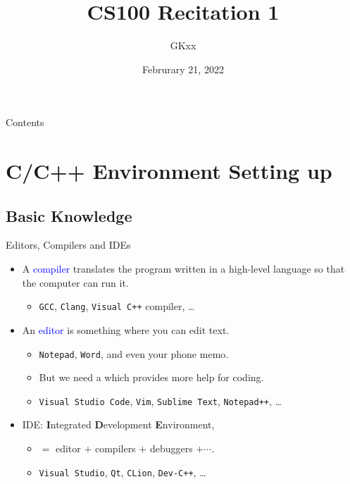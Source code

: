 \documentclass{beamer}
\title{CS100 Recitation 1}
\author{GKxx}
\date{Februrary 21, 2022}
\newcommand{\blue}[1]{\textcolor{blue}{#1}}
\begin{document}
\begin{frame}
    \maketitle
\end{frame}

\begin{frame}{Contents}
    \tableofcontents
\end{frame}

\section{C/C++ Environment Setting up}

\subsection{Basic Knowledge}

\begin{frame}{Editors, Compilers and IDEs}
    \begin{itemize}
        \item A \blue{compiler} translates the program written in a high-level language so that the computer can run it.
        \begin{itemize}
            \item \texttt{GCC}, \texttt{Clang}, \texttt{Visual C++} compiler, \dots
        \end{itemize}
        \pause
        \item An \blue{editor} is something where you can edit text.
        \begin{itemize}
            \item \texttt{Notepad}, \texttt{Word}, and even your phone memo.
            \pause
            \item But we need a  which provides more help for coding.
            \item \texttt{Visual Studio Code}, \texttt{Vim}, \texttt{Sublime Text}, \texttt{Notepad++}, \dots
        \end{itemize}
        \pause
        \item IDE: \textbf{I}ntegrated \textbf{D}evelopment \textbf{E}nvironment,
        \begin{itemize}
            \item \(=\) editor \(+\) compilers \(+\) debuggers \(+\cdots\).
            \item \texttt{Visual Studio}, \texttt{Qt}, \texttt{CLion}, \texttt{Dev-C++}, \dots
        \end{itemize}
    \end{itemize}
\end{frame}
\end{document}
